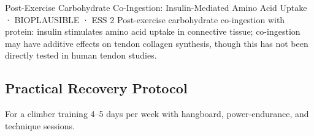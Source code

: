 \begin{bioplausbox}{Post-Exercise Carbohydrate Co-Ingestion: Insulin-Mediated Amino Acid Uptake · BIOPLAUSIBLE · ESS 2}
Post-exercise carbohydrate co-ingestion with protein: insulin stimulates amino acid uptake in connective tissue; co-ingestion may have additive effects on tendon collagen synthesis, though this has not been directly tested in human tendon studies.
\end{bioplausbox}

\subsection{Practical Recovery Protocol}

For a climber training 4--5 days per week with hangboard, power-endurance, and technique sessions.

